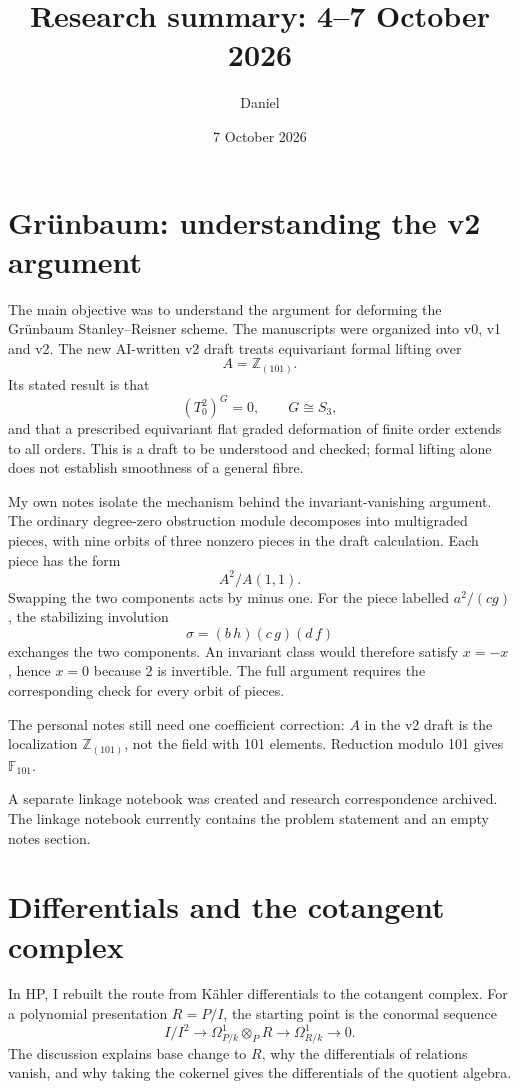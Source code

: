 \documentclass[11pt]{article}
\title{Research summary: 4--7 October 2026}
\author{Daniel}
\date{7 October 2026}
\begin{document}
\maketitle

\section*{Gr\"unbaum: understanding the v2 argument}

The main objective was to understand the
argument for deforming the Gr\"unbaum
Stanley--Reisner scheme. The
manuscripts were organized into v0, v1 and v2.
The new AI-written v2 draft treats equivariant
formal lifting over
$$
A=\mathbb{Z}_{(101)}.
$$
Its stated result is that
$$
(T^2_0)^G=0,\qquad G\cong S_3,
$$
and that a prescribed equivariant flat graded
deformation of finite order extends to all
orders. This is a draft to be understood and
checked; formal lifting alone does not
establish smoothness of a general fibre.

My own notes isolate the mechanism behind the
invariant-vanishing argument. The ordinary
degree-zero obstruction module decomposes into
multigraded pieces, with nine orbits of three
nonzero pieces in the draft calculation.
Each piece has the form
$$
A^2/A(1,1).
$$
Swapping the two components acts by minus one.
For the piece labelled $a^2/(cg)$, the
stabilizing involution
$$
\sigma=(b\,h)(c\,g)(d\,f)
$$
exchanges the two components. An invariant
class would therefore satisfy $x=-x$, hence
$x=0$ because $2$ is invertible. The full
argument requires the corresponding check
for every orbit of pieces.

The personal notes still need one coefficient
correction: $A$ in the v2 draft is the
localization $\mathbb{Z}_{(101)}$, not the
field with 101 elements. Reduction modulo
101 gives $\mathbb{F}_{101}$.

A separate linkage notebook was created and
research correspondence archived. The linkage
notebook currently contains the problem
statement and an empty notes section.

\section*{Differentials and the cotangent complex}

In HP, I rebuilt the route from K\"ahler
differentials to the cotangent complex.
For a polynomial presentation $R=P/I$, the
starting point is the conormal sequence
$$
I/I^2\longrightarrow
\Omega^1_{P/k}\otimes_P R
\longrightarrow\Omega^1_{R/k}
\longrightarrow0.
$$
The discussion explains base change to $R$,
why the differentials of relations vanish,
and why taking the cokernel gives the
differentials of the quotient algebra.
\end{document}
